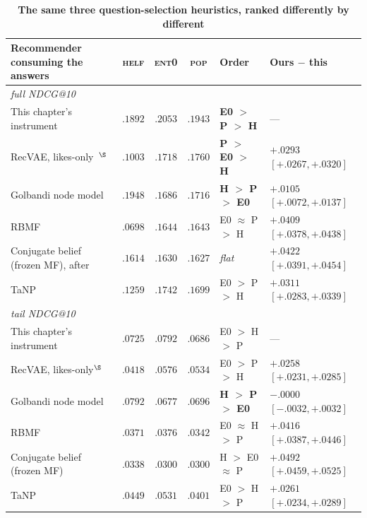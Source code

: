 \documentclass[11pt]{article}
\begin{document}
\begin{table}[!htbp]\centering\scriptsize
\setlength{\tabcolsep}{4pt}
\renewcommand{\arraystretch}{1.18}
\begin{tabular}{p{3.45cm}ccc l l}
\toprule
Recommender consuming the answers & \textsc{helf} & \textsc{ent0} & \textsc{pop} &
  Order & Ours $-$ this \\
\midrule
\multicolumn{6}{l}{\emph{full NDCG@10}}\\
This chapter's instrument & $.1892$ & $\mathbf{.2053}$ & $.1943$ & \textbf{E0 $>$ P $>$ H} & --- \\
RecVAE, likes-only~\cite{ren2020recvae}$^{\S}$ & $.1003$ & $.1718$ & $\mathbf{.1760}$ & \textbf{P $>$ E0 $>$ H} & $+.0293$ $[+.0267,+.0320]$ \\
Golbandi node model~\cite{golbandi2011adaptive} & $\mathbf{.1948}$ & $.1686$ & $.1716$ & \textbf{H $>$ P $>$ E0} & $+.0105$ $[+.0072,+.0137]$ \\
RBMF~\cite{liu2011wisdom,zhou2011functional} & $.0698$ & $\mathbf{.1644}$ & $.1643$ & E0 $\approx$ P $>$ H & $+.0409$ $[+.0378,+.0438]$ \\
Conjugate belief (frozen MF), after~\cite{biyik2023soft} & $.1614$ & $.1630$ & $.1627$ & \emph{flat} & $+.0422$ $[+.0391,+.0454]$ \\
TaNP~\cite{lin2021tanp} & $.1259$ & $\mathbf{.1742}$ & $.1699$ & E0 $>$ P $>$ H & $+.0311$ $[+.0283,+.0339]$ \\
\midrule
\multicolumn{6}{l}{\emph{tail NDCG@10}}\\
This chapter's instrument & $.0725$ & $\mathbf{.0792}$ & $.0686$ & E0 $>$ H $>$ P & --- \\
RecVAE, likes-only$^{\S}$ & $.0418$ & $\mathbf{.0576}$ & $.0534$ & E0 $>$ P $>$ H & $+.0258$ $[+.0231,+.0285]$ \\
Golbandi node model & $\mathbf{.0792}$ & $.0677$ & $.0696$ & \textbf{H $>$ P $>$ E0} & $-.0000$ $[-.0032,+.0032]$ \\
RBMF & $.0371$ & $\mathbf{.0376}$ & $.0342$ & E0 $\approx$ H $>$ P & $+.0416$ $[+.0387,+.0446]$ \\
Conjugate belief (frozen MF) & $\mathbf{.0338}$ & $.0300$ & $.0300$ & H $>$ E0 $\approx$ P & $+.0492$ $[+.0459,+.0525]$ \\
TaNP & $.0449$ & $\mathbf{.0531}$ & $.0401$ & E0 $>$ H $>$ P & $+.0261$ $[+.0234,+.0289]$ \\
\bottomrule
\end{tabular}
\caption{\textbf{The same three question-selection heuristics, ranked differently by different
}}
\end{table}
\end{document}
